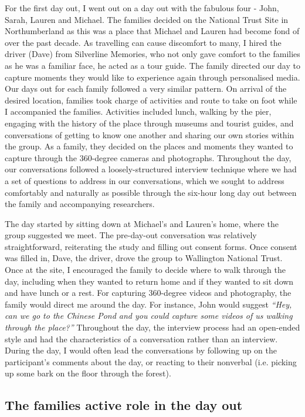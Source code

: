 For the first day out, I went out on a day out with the fabulous four - John, Sarah, Lauren and Michael. The families decided on the National Trust Site in Northumberland as this was a place that Michael and Lauren had become fond of over the past decade. As travelling can cause discomfort to many, I hired the driver (Dave) from Silverline Memories, who not only gave comfort to the families as he was a familiar face, he acted as a tour guide. The family directed our day to capture moments they would like to experience again through personalised media. Our days out for each family followed a very similar pattern. On arrival of the desired location, families took charge of activities and route to take on foot while I accompanied the families. Activities included lunch, walking by the pier, engaging with the history of the place through museums and tourist guides, and conversations of getting to know one another and sharing our own stories within the group. As a family, they decided on the places and moments they wanted to capture through the 360-degree cameras and photographs. Throughout the day, our conversations followed a loosely-structured interview technique where we had a set of questions to address in our conversations, which we sought to address comfortably and naturally as possible through the six-hour long day out between the family and accompanying researchers.

The day started by sitting down at Michael's and Lauren's home, where the group suggested we meet. The pre-day-out conversation was relatively straightforward, reiterating the study and filling out consent forms. Once consent was filled in, Dave, the driver, drove the group to Wallington National Trust. Once at the site, I encouraged the family to decide where to walk through the day, including when they wanted to return home and if they wanted to sit down and have lunch or a rest. For capturing 360-degree videos and photography, the family would direct me around the day. For instance, John would suggest \textit{``Hey, can we go to the Chinese Pond and you could capture some videos of us walking through the place?''} Throughout the day, the interview process had an open-ended style and had the characteristics of a conversation rather than an interview. During the day, I would often lead the conversations by following up on the participant's comments about the day, or reacting to their nonverbal (i.e. picking up some bark on the floor through the forest).

\subsection{The families active role in the day out}
\label{ActiveRole}


